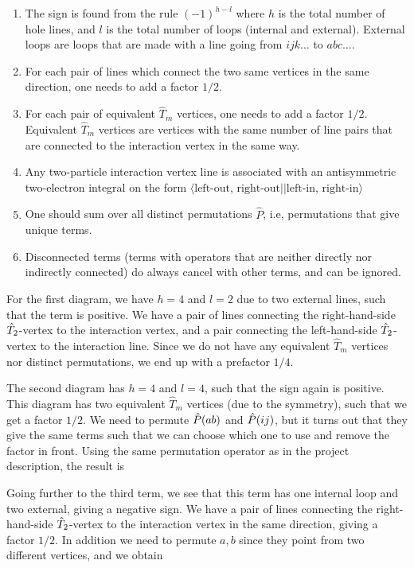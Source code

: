 \begin{enumerate}
    \item The sign is found from the rule $(-1)^{h-l}$ where $h$ is the total number of hole lines, and $l$ is the total number of loops (internal and external). External loops are loops that are made with a line going from $ijk\hdots$ to $abc\hdots$.
    \item For each pair of lines which connect the two same vertices in the same direction, one needs to add a factor $1/2$.
    \item For each pair of equivalent $\hat{T}_m$ vertices, one needs to add a factor $1/2$. Equivalent $\hat{T}_m$ vertices are vertices with the same number of line pairs that are connected to the interaction vertex in the same way. 
    \item Any two-particle interaction vertex line is associated with an antisymmetric two-electron integral on the form $\langle\text{left-out, right-out}||\text{left-in, right-in}\rangle$
    \item One should sum over all distinct permutations $\hat{P}$, i.e, permutations that give unique terms.
    \item Disconnected terms (terms with operators that are neither directly nor indirectly connected) do always cancel with other terms, and can be ignored.
\end{enumerate}

For the first diagram, we have $h=4$ and $l=2$ due to two external lines, such that the term is positive. We have a pair of lines connecting the right-hand-side $\hat{T}_2$-vertex to the interaction vertex, and a pair connecting the left-hand-side $\hat{T}_2$-vertex to the interaction line. Since we do not have any equivalent $\hat{T}_m$ vertices nor distinct permutations, we end up with a prefactor $1/4$.


The second diagram has $h=4$ and $l=4$, such that the sign again is positive. This diagram has two equivalent $\hat{T}_m$ vertices (due to the symmetry), such that we get a factor $1/2$. We need to permute $\hat{P}(ab)$ and $\hat{P}(ij)$, but it turns out that they give the same terms such that we can choose which one to use and remove the factor in front. Using the same permutation operator as in the project description, the result is


Going further to the third term, we see that this term has one internal loop and two external, giving a negative sign. We have a pair of lines connecting the right-hand-side $\hat{T}_2$-vertex to the interaction vertex in the same direction, giving a factor $1/2$. In addition we need to permute $a,b$ since they point from two different vertices, and we obtain


